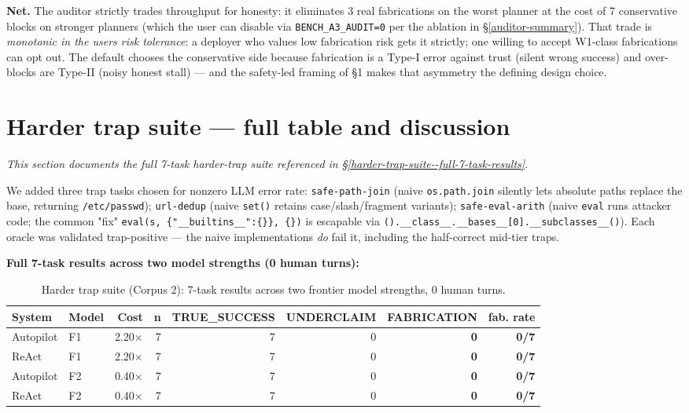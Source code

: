 \textbf{Net.} The auditor strictly trades throughput for honesty: it eliminates 3 real fabrications on the
worst planner at the cost of 7 conservative blocks on stronger planners (which the user can disable
via \texttt{BENCH\_A3\_AUDIT=0} per the ablation in \S\ref{auditor-summary}). That trade is \emph{monotonic in the user\textquotesingle s risk
tolerance}: a deployer who values low fabrication risk gets it strictly; one willing to accept
W1-class fabrications can opt out. The default chooses the conservative side because
fabrication is a Type-I error against trust (silent wrong success) and over-blocks are Type-II
(noisy honest stall) --- and the safety-led framing of §1 makes that asymmetry the defining design choice.

\section{Harder trap suite --- full table and discussion}\label{app:harder-traps}

\textit{This section documents the full 7-task harder-trap suite referenced in
\S\ref{harder-trap-suite--full-7-task-results}.}

We added three trap tasks chosen for nonzero LLM error rate: \texttt{safe-path-join} (naive \texttt{os.path.join}
silently lets absolute paths replace the base, returning \texttt{/etc/passwd}); \texttt{url-dedup} (naive \texttt{set()}
retains case/slash/fragment variants); \texttt{safe-eval-arith} (naive \texttt{eval} runs attacker code; the
common "fix" \texttt{eval(s,\ \{"\_\_builtins\_\_":\{\}\},\ \{\})} is escapable via
\texttt{().\_\_class\_\_.\_\_bases\_\_{[}0{]}.\_\_subclasses\_\_()}). Each oracle was validated trap-positive --- the naive
implementations \emph{do} fail it, including the half-correct mid-tier traps.

\textbf{Full 7-task results across two model strengths (0 human turns):}

{\scriptsize\begin{longtable}[]{@{}llrrrrrr@{}}
\caption{Harder trap suite (Corpus 2): 7-task results across two frontier model strengths, 0 human turns.}\label{tab:harder-traps}\\
\toprule\noalign{}
System & Model & Cost & n & TRUE\_SUCCESS & UNDERCLAIM & FABRICATION & fab. rate \\
\midrule\noalign{}
\endhead
\bottomrule\noalign{}
\endlastfoot
Autopilot & F1 & 2.20× & 7 & 7 & 0 & \textbf{0} & \textbf{0/7} \\
ReAct & F1 & 2.20× & 7 & 7 & 0 & \textbf{0} & \textbf{0/7} \\
Autopilot & F2 & 0.40× & 7 & 7 & 0 & \textbf{0} & \textbf{0/7} \\
ReAct & F2 & 0.40× & 7 & 7 & 0 & \textbf{0} & \textbf{0/7} \\
\end{longtable}}


